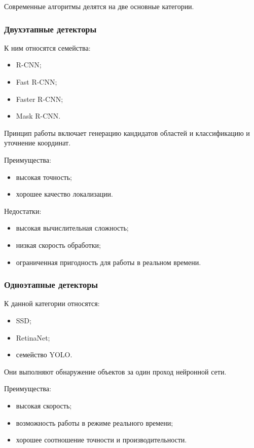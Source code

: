 Современные алгоритмы делятся на две основные категории.

\subsubsection{Двухэтапные детекторы}

К ним относятся семейства:

\begin{itemize}
	\item R-CNN;
	\item Fast R-CNN;
	\item Faster R-CNN;
	\item Mask R-CNN.
\end{itemize}

Принцип работы включает генерацию кандидатов областей и классификацию и уточнение координат.

Преимущества:

\begin{itemize}
	\item высокая точность;
	\item хорошее качество локализации.
\end{itemize}

Недостатки:

\begin{itemize}
	\item высокая вычислительная сложность;
	\item низкая скорость обработки;
	\item ограниченная пригодность для работы в реальном времени.
\end{itemize}

\subsubsection{Одноэтапные детекторы}

К данной категории относятся:

\begin{itemize}
	\item SSD;
	\item RetinaNet;
	\item семейство YOLO.
\end{itemize}

Они выполняют обнаружение объектов за один проход нейронной сети.

Преимущества:

\begin{itemize}
	\item высокая скорость;
	\item возможность работы в режиме реального времени;
	\item хорошее соотношение точности и производительности.
\end{itemize}

